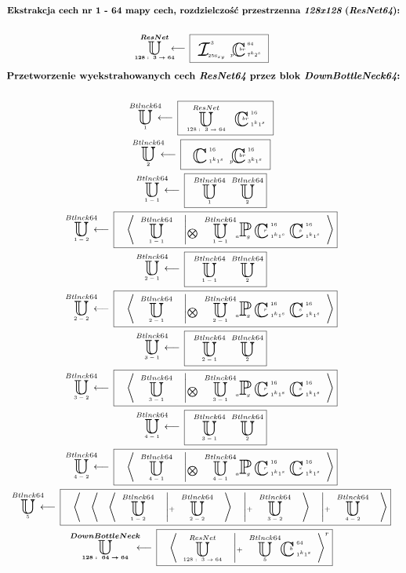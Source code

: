 \begin{equation*}
\begin{gathered}
\textbf{Ekstrakcja cech nr 1 - 64 mapy cech, rozdzielczość przestrzenna $\textit{128x128}$ ($\textit{ResNet64}$):}
\\~\\
\xunitdef{\boldsymbol{ResNet}}{\boldsymbol{128:\ 3\rightarrow64}}{\quad
\xinp{256_{xy}}{3}{}{}{}
\xconv{\ 7^k2^s}{\ 64}{p}{}{br}}
\end{gathered}
\end{equation*}
\begin{equation*}
\begin{gathered}
\textbf{Przetworzenie wyekstrahowanych cech $\textit{ResNet64}$ przez blok $\textit{DownBottleNeck64}$:}
\\~\\
\xunitdef{Btlnck64}{1}{\quad
\xunit{ResNet}{128:\ 3\rightarrow64}{} \quad
\xconv{\ 1^k1^s}{\ 16}{}{}{br}}
\\
\xunitdef{Btlnck64}{2}{\quad
\xconv{\ 1^k1^s}{\ 16}{}{}{}
\xconv{\ 3^k1^s}{\ 16}{p}{}{br}}
\\
\xunitdef{Btlnck64}{1-1}{\quad
\xunit{Btlnck64}{1}{} \quad
\xunit{Btlnck64}{2}{}}
\\
\xunitdef{Btlnck64}{1-2}{\quad
\xaggreg{\quad
\xunit{Btlnck64}{1-1}{}
\quad \left|_{\bigotimes} \quad
\xunit{Btlnck64}{1-1}{}
\xpool{g}{}{a}{}{}
\xconv{\ 1^k1^s}{\ 16}{}{}{r}
\xconv{\ 1^k1^s}{\ 16}{}{}{s}
\right.}}
\\
\xunitdef{Btlnck64}{2-1}{\quad
\xunit{Btlnck64}{1-1}{} \quad
\xunit{Btlnck64}{2}{}}
\\
\xunitdef{Btlnck64}{2-2}{\quad
\xaggreg{\quad
\xunit{Btlnck64}{2-1}{}
\quad \left|_{\bigotimes} \quad
\xunit{Btlnck64}{2-1}{}
\xpool{g}{}{a}{}{}
\xconv{\ 1^k1^s}{\ 16}{}{}{r}
\xconv{\ 1^k1^s}{\ 16}{}{}{s}
\right.}}
\\
\xunitdef{Btlnck64}{3-1}{\quad
\xunit{Btlnck64}{2-1}{} \quad
\xunit{Btlnck64}{2}{}}
\\
\xunitdef{Btlnck64}{3-2}{\quad
\xaggreg{\quad
\xunit{Btlnck64}{3-1}{}
\quad \left|_{\bigotimes} \quad
\xunit{Btlnck64}{3-1}{}
\xpool{g}{}{a}{}{}
\xconv{\ 1^k1^s}{\ 16}{}{}{r}
\xconv{\ 1^k1^s}{\ 16}{}{}{s}
\right.}}
\\
\xunitdef{Btlnck64}{4-1}{\quad
\xunit{Btlnck64}{3-1}{} \quad
\xunit{Btlnck64}{2}{}}
\\
\xunitdef{Btlnck64}{4-2}{\quad
\xaggreg{\quad
\xunit{Btlnck64}{4-1}{}
\quad \left|_{\bigotimes} \quad
\xunit{Btlnck64}{4-1}{}
\xpool{g}{}{a}{}{}
\xconv{\ 1^k1^s}{\ 16}{}{}{r}
\xconv{\ 1^k1^s}{\ 16}{}{}{s}
\right.}}
\\
\xunitdef{Btlnck64}{5}{\quad
\xaggreg{\quad
\xaggreg{\quad
\xaggreg{\quad
\xunit{Btlnck64}{1-2}{}
\quad \left|_+ \quad
\xunit{Btlnck64}{2-2}{}
\right.\quad}
\quad \left|_+ \quad
\xunit{Btlnck64}{3-2}{}
\right.\quad}
\quad \left|_+ \quad
\xunit{Btlnck64}{4-2}{}
\right.\quad}}
\\
\xunitdef{\boldsymbol{DownBottleNeck}}{\boldsymbol{128:\ 64\rightarrow64}}{\quad
\xaggreg{\quad
\xunit{ResNet}{128:\ 3\rightarrow64}{}
\quad \left|_+ \quad
\xunit{Btlnck64}{5}{}
\xconv{\ 1^k1^s}{\ 64}{}{}{b}
\right.}^r}
\end{gathered}
\end{equation*}
